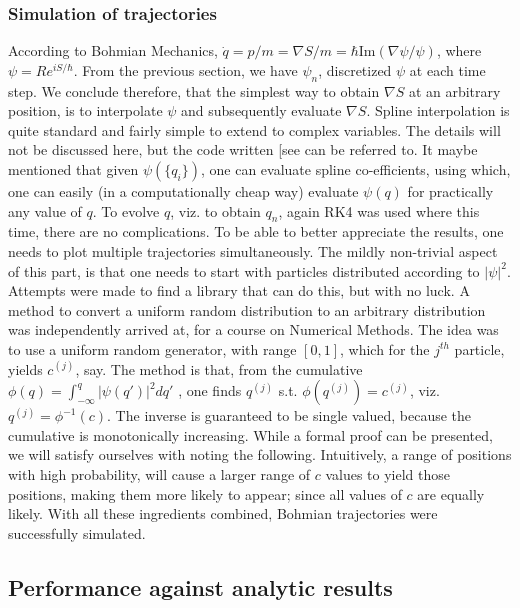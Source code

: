 \subsubsection{Simulation of trajectories}

According to Bohmian Mechanics, $\dot{q}=p/m=\nabla S/m=\hbar\text{Im}(\nabla\psi/\psi)$,
where $\psi=Re^{iS/\hbar}$. From the previous section, we have $\psi_{n}$,
discretized $\psi$ at each time step. We conclude therefore, that
the simplest way to obtain $\nabla S$ at an arbitrary position, is
to interpolate $\psi$ and subsequently evaluate $\nabla S$. Spline
interpolation is quite standard and fairly simple to extend to complex
variables. The details will not be discussed here, but the code written
{[}see \prettyref{sub:BM-Simulation-Results}{]} can be referred to.
It maybe mentioned that given $\psi(\{q_{i}\})$, one can evaluate
spline co-efficients, using which, one can easily (in a computationally
cheap way) evaluate $\psi(q)$ for practically any value of $q$.
To evolve $q$, viz. to obtain $q_{n}$, again RK4 was used where
this time, there are no complications. To be able to better appreciate
the results, one needs to plot multiple trajectories simultaneously.
The mildly non-trivial aspect of this part, is that one needs to start
with particles distributed according to $|\psi|^{2}$. Attempts were
made to find a library that can do this, but with no luck. A method
to convert a uniform random distribution to an arbitrary distribution
was independently arrived at, for a course on Numerical Methods. The
idea was to use a uniform random generator, with range $[0,1]$, which
for the $j^{th}$ particle, yields $c^{(j)}$, say. The method is
that, from the cumulative $\phi(q)=\int_{-\infty}^{q}\left|\psi(q')\right|^{2}dq'$
, one finds $q^{(j)}$ s.t. $\phi(q^{(j)})=c^{(j)}$, viz. $q^{(j)}=\phi^{-1}(c)$.
The inverse is guaranteed to be single valued, because the cumulative
is monotonically increasing. While a formal proof can be presented,
we will satisfy ourselves with noting the following. Intuitively,
a range of positions with high probability, will cause a larger range
of $c$ values to yield those positions, making them more likely to
appear; since all values of $c$ are equally likely. With all these
ingredients combined, Bohmian trajectories were successfully simulated.


\subsection{Performance against analytic results}

